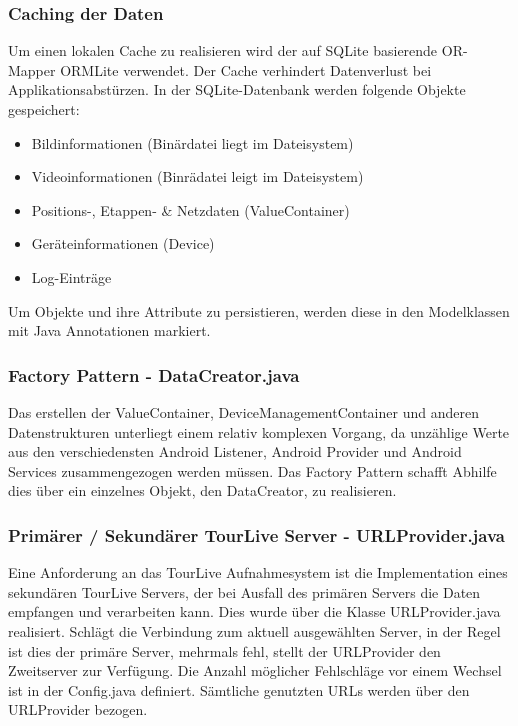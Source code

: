 \subsubsection{Caching der Daten}
Um einen lokalen Cache zu realisieren wird der auf SQLite basierende OR-Mapper ORMLite verwendet. Der Cache verhindert Datenverlust bei Applikationsabstürzen. In der SQLite-Datenbank werden folgende Objekte gespeichert:

\begin{itemize} [noitemsep,topsep=0pt]
	\item Bildinformationen (Binärdatei liegt im Dateisystem)
	\item Videoinformationen (Binrädatei leigt im Dateisystem)
	\item Positions-, Etappen- \& Netzdaten (ValueContainer)
	\item Geräteinformationen (Device)
	\item Log-Einträge
\end{itemize}

Um Objekte und ihre Attribute zu persistieren, werden diese in den Modelklassen mit Java Annotationen markiert. 

\subsubsection{Factory Pattern - DataCreator.java}
Das erstellen der ValueContainer, DeviceManagementContainer und anderen Datenstrukturen unterliegt einem relativ komplexen Vorgang, da unzählige Werte aus den verschiedensten Android Listener,  Android Provider und Android Services zusammengezogen werden müssen. Das Factory Pattern schafft Abhilfe dies über ein einzelnes Objekt, den DataCreator, zu realisieren.

\subsubsection{Primärer / Sekundärer TourLive Server - URLProvider.java}
Eine Anforderung an das TourLive Aufnahmesystem ist die Implementation eines sekundären TourLive Servers, der bei Ausfall des primären Servers die Daten empfangen und verarbeiten kann. Dies wurde über die Klasse URLProvider.java realisiert. Schlägt die Verbindung zum aktuell ausgewählten Server, in der Regel ist dies der primäre Server, mehrmals fehl, stellt der URLProvider den Zweitserver zur Verfügung. Die Anzahl möglicher Fehlschläge vor einem Wechsel ist in der Config.java definiert. Sämtliche genutzten URLs werden über den URLProvider bezogen.

